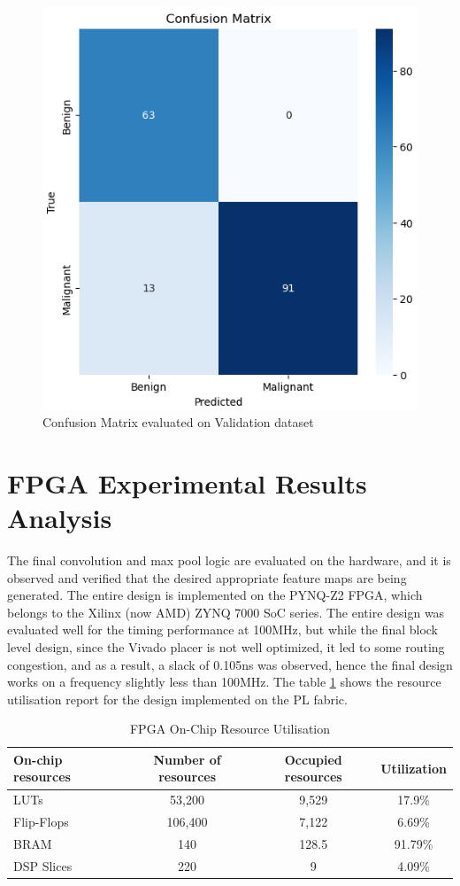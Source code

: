     \begin{figure}[H]
        \centering
        \includegraphics[width=0.75\linewidth]{images/conf_matrix.png}
        \caption{Confusion Matrix evaluated on Validation dataset}
        \label{fig:enter-label}
    \end{figure}
    
    \section{FPGA Experimental Results Analysis}
    \noindent
    The final convolution and max pool logic are evaluated on the hardware, and it is observed and verified that the desired appropriate feature maps are being generated.
    The entire design is implemented on the PYNQ-Z2 FPGA, which belongs to the Xilinx (now AMD) ZYNQ 7000 SoC series. The entire design was evaluated well for the timing performance at 100MHz, but while the final block level design, since the Vivado placer is not well optimized, it led to some routing congestion, and as a result, a slack of 0.105ns was observed, hence the final design works on a frequency slightly less than 100MHz. The table \ref{tab:onchip-resources} shows the resource utilisation report for the design implemented on the PL fabric.

    \begin{table}[h!]
    \centering
    \begin{tabular}{|l|c|c|c|}
        \hline
        \textbf{On-chip resources} & \textbf{Number of resources} & \textbf{Occupied resources} & \textbf{Utilization} \\
        \hline
        LUTs         & 53,200    & 9,529     & 17.9\%   \\
        Flip-Flops   & 106,400   & 7,122     & 6.69\%   \\
        BRAM         & 140       & 128.5     & 91.79\%  \\
        DSP Slices   & 220       & 9         & 4.09\%   \\
        \hline
    \end{tabular}
    \caption{FPGA On-Chip Resource Utilisation}
    \label{tab:onchip-resources}
    \end{table}

